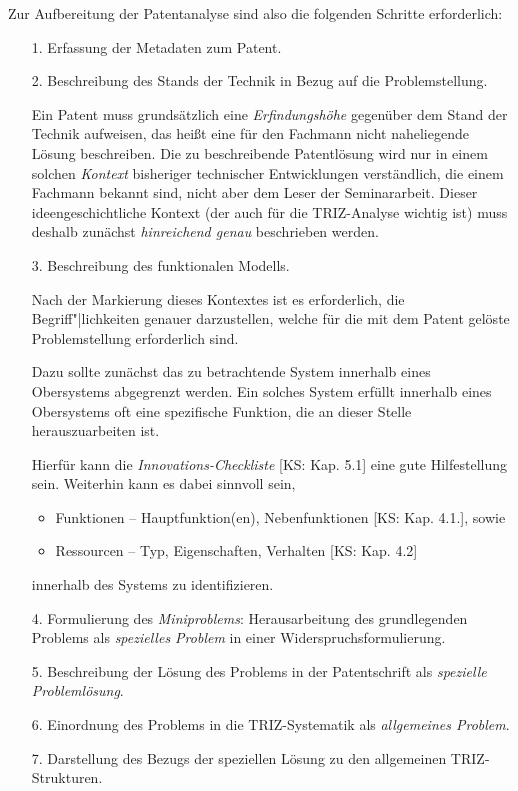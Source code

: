 \documentclass[11pt,a4paper]{article}
\begin{document}
Zur Aufbereitung der Patentanalyse sind also die folgenden Schritte
erforderlich:
\begin{itemize}
\item[1.] Erfassung der Metadaten zum Patent.
  
\item[2.] Beschreibung des Stands der Technik in Bezug auf die
  Problemstellung.

  Ein Patent muss grundsätzlich eine \emph{Erfindungshöhe} gegenüber dem Stand
  der Technik aufweisen, das heißt eine für den Fachmann nicht naheliegende
  Lösung beschreiben.  Die zu beschreibende Patentlösung wird nur in einem
  solchen \emph{Kontext} bisheriger technischer Entwicklungen verständlich,
  die einem Fachmann bekannt sind, nicht aber dem Leser der Seminararbeit.
  Dieser ideengeschichtliche Kontext (der auch für die TRIZ-Analyse wichtig
  ist) muss deshalb zunächst \emph{hinreichend genau} beschrieben werden.

\item[3.] Beschreibung des funktionalen Modells.

  Nach der Markierung dieses Kontextes ist es erforderlich, die
  Begriff"|lichkeiten genauer darzustellen, welche für die mit dem Patent
  gelöste Problemstellung erforderlich sind. 

  Dazu sollte zunächst das zu betrachtende System innerhalb eines Obersystems
  abgegrenzt werden. Ein solches System erfüllt innerhalb eines Obersystems
  oft eine spezifische Funktion, die an dieser Stelle herauszuarbeiten ist. 
  
  Hierfür kann die \emph{Innovations-Checkliste} [KS: Kap. 5.1] eine gute
  Hilfestellung sein.  Weiterhin kann es dabei sinnvoll sein,
  \begin{itemize}
  \item Funktionen -- Hauptfunktion(en), Nebenfunktionen [KS: Kap. 4.1.],
    sowie 
  \item Ressourcen -- Typ, Eigenschaften, Verhalten [KS: Kap. 4.2]
  \end{itemize}
  innerhalb des Systems zu identifizieren. 

\item[4.] Formulierung des \emph{Miniproblems}: Herausarbeitung des
  grundlegenden Problems als \emph{spezielles Problem} in einer
  Widerspruchsformulierung.

\item[5.] Beschreibung der Lösung des Problems in der Patentschrift als
  \emph{spezielle Problemlösung}.

\item[6.] Einordnung des Problems in die TRIZ-Systematik als \emph{allgemeines
  Problem}. 

\item[7.] Darstellung des Bezugs der speziellen Lösung zu den allgemeinen
  TRIZ-Strukturen. 
\end{itemize}
\end{document}
